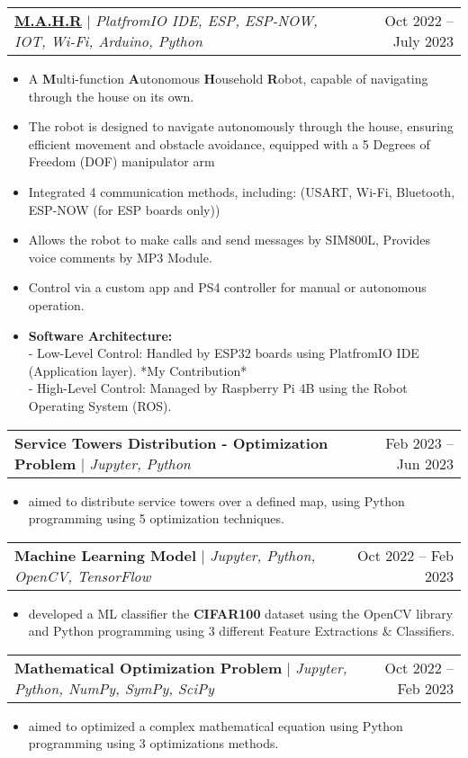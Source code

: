 \documentclass[letterpaper,11pt]{article}
\makeatletter
\newcommand{\resumeItem}[1]{
  \item\small{
    {#1 \vspace{-2pt}}
  }
}
\newcommand{\resumeProjectHeading}[2]{
    \item
    \begin{tabular*}{0.97\textwidth}{l@{\extracolsep{\fill}}r}
      \small#1 & #2 \\
    \end{tabular*}\vspace{-7pt}
}
\newcommand{\resumeItemListStart}{\begin{itemize}}
\newcommand{\resumeItemListEnd}{\end{itemize}\vspace{-5pt}}
\makeatother
\begin{document}
      \resumeProjectHeading
        {\textbf{\href{https://github.com/MostafaQusit/MAHR-GraduationProject}{M.A.H.R}} $|$ \emph{PlatfromIO IDE, ESP, ESP-NOW, IOT, Wi-Fi, Arduino, Python}}{Oct 2022 -- July 2023}
        \resumeItemListStart
          \resumeItem{A \textbf{M}ulti-function \textbf{A}utonomous \textbf{H}ousehold \textbf{R}obot, capable of navigating through the house on its own.}
          \resumeItem{The robot is designed to navigate autonomously through the house, ensuring efficient movement and obstacle avoidance, equipped with a 5 Degrees of Freedom (DOF) manipulator arm}
          
          \resumeItem{Integrated 4 communication methods, including: (USART, Wi-Fi, Bluetooth, ESP-NOW (for ESP boards only))}
          \resumeItem{Allows the robot to make calls and send messages by SIM800L, Provides voice comments by MP3 Module.}
          
          \resumeItem{Control via a custom app and PS4 controller for manual or autonomous operation.}          
          \resumeItem{\textbf{Software Architecture:}\\
          - Low-Level Control: Handled by ESP32 boards using PlatfromIO IDE (Application layer). *My Contribution*\\
          - High-Level Control: Managed by Raspberry Pi 4B using the Robot Operating System (ROS).}
        \resumeItemListEnd

      \resumeProjectHeading
        {\textbf{Service Towers Distribution - Optimization Problem} $|$ \emph{Jupyter, Python}}{Feb 2023 -- Jun 2023}
        \resumeItemListStart
          \resumeItem{aimed to distribute service towers over a defined map, using Python programming using 5 optimization techniques.}
        \resumeItemListEnd
      
      \resumeProjectHeading
        {\textbf{Machine Learning Model} $|$ \emph{Jupyter, Python, OpenCV, TensorFlow}}{Oct 2022 -- Feb 2023}
        \resumeItemListStart
          \resumeItem{developed a ML classifier the \textbf{CIFAR100} dataset using the OpenCV library and Python programming using 3 different Feature Extractions \& Classifiers.}
        \resumeItemListEnd
          
      \resumeProjectHeading
        {\textbf{Mathematical Optimization Problem} $|$ \emph{Jupyter, Python, NumPy, SymPy, SciPy}}{Oct 2022 -- Feb 2023}
        \resumeItemListStart
          \resumeItem{aimed to optimized a complex mathematical equation using Python programming using 3 optimizations methods.}
        \resumeItemListEnd
\end{document}
